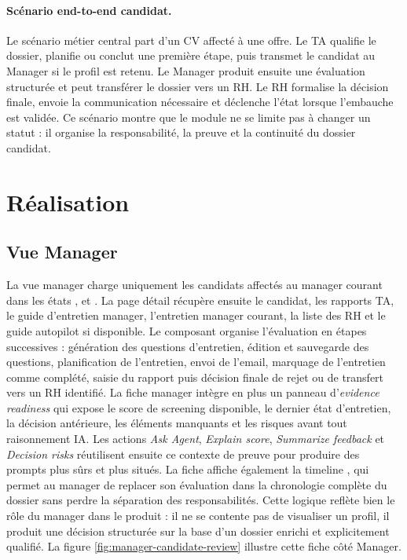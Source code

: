 \paragraph{Scénario end-to-end candidat.}
Le scénario métier central part d'un CV affecté à une offre. Le TA qualifie le dossier, planifie ou conclut une première étape, puis transmet le candidat au Manager si le profil est retenu. Le Manager produit ensuite une évaluation structurée et peut transférer le dossier vers un RH. Le RH formalise la décision finale, envoie la communication nécessaire et déclenche l'état  lorsque l'embauche est validée. Ce scénario montre que le module ne se limite pas à changer un statut : il organise la responsabilité, la preuve et la continuité du dossier candidat.

\section{Réalisation}

\subsection{Vue Manager}
La vue manager charge uniquement les candidats affectés au manager courant dans les états ,  et . La page détail récupère ensuite le candidat, les rapports TA, le guide d'entretien manager, l'entretien manager courant, la liste des RH et le guide autopilot si disponible.
Le composant  organise l'évaluation en étapes successives : génération des questions d'entretien, édition et sauvegarde des questions, planification de l'entretien, envoi de l'email, marquage de l'entretien comme complété, saisie du rapport puis décision finale de rejet ou de transfert vers un RH identifié.
La fiche manager intègre en plus un panneau d'\textit{evidence readiness} qui expose le score de screening disponible, le dernier état d'entretien, la décision antérieure, les éléments manquants et les risques avant tout raisonnement IA. Les actions \textit{Ask Agent}, \textit{Explain score}, \textit{Summarize feedback} et \textit{Decision risks} réutilisent ensuite ce contexte de preuve pour produire des prompts plus sûrs et plus situés.
La fiche affiche également la timeline , qui permet au manager de replacer son évaluation dans la chronologie complète du dossier sans perdre la séparation des responsabilités.
Cette logique reflète bien le rôle du manager dans le produit : il ne se contente pas de visualiser un profil, il produit une décision structurée sur la base d'un dossier enrichi et explicitement qualifié. La figure \ref{fig:manager-candidate-review} illustre cette fiche côté Manager.

